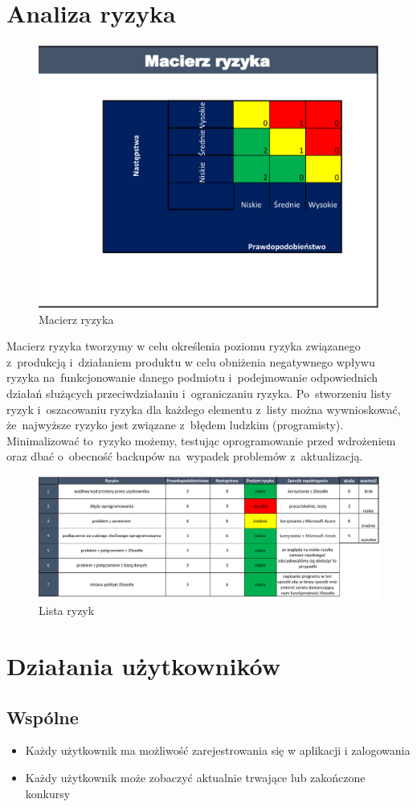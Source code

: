 \documentclass{article}
\begin{document}
\section{Analiza ryzyka}


\begin{figure}[H]
	\centering
	\includegraphics[width=.5\linewidth]{macierz_ryzyka.png}
	\caption{Macierz ryzyka}
\end{figure}

Macierz ryzyka tworzymy w celu określenia poziomu ryzyka związanego z~produkcją i~działaniem produktu w celu obniżenia negatywnego wpływu ryzyka na~funkcjonowanie danego podmiotu i~podejmowanie odpowiednich działań służących przeciwdziałaniu i~ograniczaniu ryzyka. Po~stworzeniu listy ryzyk i~oszacowaniu ryzyka dla każdego elementu z~listy można wywnioskować, że~najwyższe ryzyko jest związane z~błędem ludzkim (programisty). Minimalizować to~ryzyko możemy, testując oprogramowanie przed wdrożeniem oraz dbać o~obecność backupów na~wypadek problemów z~aktualizacją.

\begin{figure}[H]
	\centering
	\includegraphics[width=.95\linewidth]{lista_ryzyk.png}
	\caption{Lista ryzyk}
\end{figure}

\section{Działania użytkowników}
\subsection{Wspólne}
\begin{itemize}
    \item Każdy użytkownik ma możliwość zarejestrowania się w aplikacji i zalogowania
    \item Każdy użytkownik może zobaczyć aktualnie trwające lub zakończone konkursy
\end{itemize}
\end{document}
